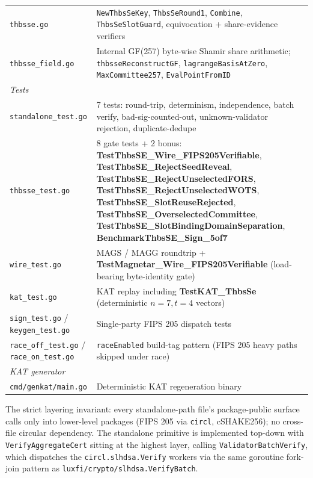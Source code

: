 \begin{table}[H]
\begin{tabular}{lp{8cm}}
\midrule
\texttt{thbsse.go}         & \texttt{NewThbsSeKey}, \texttt{ThbsSeRound1}, \texttt{Combine}, \texttt{ThbsSeSlotGuard}, equivocation + share-evidence verifiers \\
\texttt{thbsse\_field.go}  & Internal GF(257) byte-wise Shamir share arithmetic; \texttt{thbsseReconstructGF}, \texttt{lagrangeBasisAtZero}, \texttt{MaxCommittee257}, \texttt{EvalPointFromID} \\
\midrule
\multicolumn{2}{l}{\emph{Tests}} \\
\midrule
\texttt{standalone\_test.go}      & 7 tests: round-trip, determinism, independence, batch verify, bad-sig-counted-out, unknown-validator rejection, duplicate-dedupe \\
\texttt{thbsse\_test.go}          & 8 gate tests + 2 bonus: \textbf{TestThbsSE\_Wire\_FIPS205Verifiable}, \textbf{TestThbsSE\_RejectSeedReveal}, \textbf{TestThbsSE\_RejectUnselectedFORS}, \textbf{TestThbsSE\_RejectUnselectedWOTS}, \textbf{TestThbsSE\_SlotReuseRejected}, \textbf{TestThbsSE\_OverselectedCommittee}, \textbf{TestThbsSE\_SlotBindingDomainSeparation}, \textbf{BenchmarkThbsSE\_Sign\_5of7} \\
\texttt{wire\_test.go}            & MAGS / MAGG roundtrip + \textbf{TestMagnetar\_Wire\_FIPS205Verifiable} (load-bearing byte-identity gate) \\
\texttt{kat\_test.go}             & KAT replay including \textbf{TestKAT\_ThbsSe} (deterministic $n=7,t=4$ vectors) \\
\texttt{sign\_test.go} / \texttt{keygen\_test.go} & Single-party FIPS 205 dispatch tests \\
\texttt{race\_off\_test.go} / \texttt{race\_on\_test.go} & \texttt{raceEnabled} build-tag pattern (FIPS 205 heavy paths skipped under race) \\
\midrule
\multicolumn{2}{l}{\emph{KAT generator}} \\
\midrule
\texttt{cmd/genkat/main.go}     & Deterministic KAT regeneration binary \\
\bottomrule
\end{tabular}
\end{table}

The strict layering invariant: every standalone-path file's
package-public surface calls only into lower-level packages (FIPS
205 via \texttt{circl}, cSHAKE256); no cross-file circular
dependency. The standalone primitive is implemented top-down with
\texttt{VerifyAggregateCert} sitting at the highest layer, calling
\texttt{ValidatorBatchVerify}, which dispatches the
\texttt{circl.slhdsa.Verify} workers via the same goroutine
fork-join pattern as \texttt{luxfi/crypto/slhdsa.VerifyBatch}.

